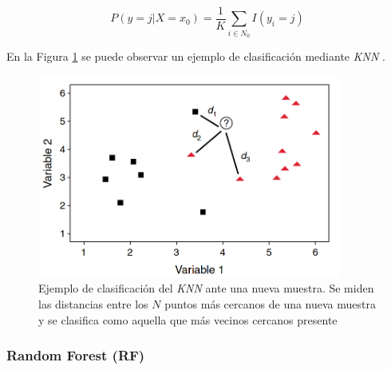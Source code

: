 \[
P(y = j | X = x_0)  = \frac{1}{K} \sum_{i\in N_0} I(y_i = j)
\]

En la Figura \ref{KNN_BACKGROUND} se puede observar un ejemplo de clasificación mediante \textit{KNN} \cite{VIDUEIRAFERREIRA2015195}.

\begin{figure}[H]
	\centering
	\includegraphics[width=10cm]{Figures/Background/KNN.png}
	\caption[Ejemplo de clasificación del \textit{KNN} ante una nueva muestra] {Ejemplo de clasificación del \textit{KNN} ante una nueva muestra. Se miden las distancias entre los $N$ puntos más cercanos de una nueva muestra y se clasifica como aquella que más vecinos cercanos presente}
	\label{KNN_BACKGROUND}
\end{figure}


\subsubsection*{Random Forest (RF)}
\label{RF_INTRODUCTION_TO_ENSEMBLES}



